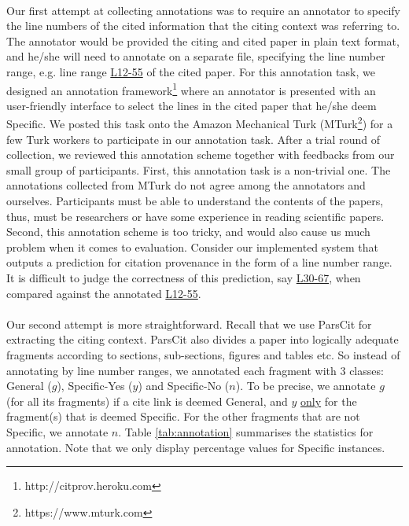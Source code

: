 \paragraph{}
Our first attempt at collecting annotations was to require an annotator to specify the line numbers of the cited information that the citing context was referring to. The annotator would be provided the citing and cited paper in plain text format, and he/she will need to annotate on a separate file, specifying the line number range, e.g. line range \url{L12-55} of the cited paper. For this annotation task, we designed an annotation framework\footnote{http://citprov.heroku.com} where an annotator is presented with an user-friendly interface to select the lines in the cited paper that he/she deem Specific. We posted this task onto the Amazon Mechanical Turk (MTurk\footnote{https://www.mturk.com}) for a few Turk workers to participate in our annotation task. After a trial round of collection, we reviewed this annotation scheme together with feedbacks from our small group of participants. First, this annotation task is a non-trivial one. The annotations collected from MTurk do not agree among the annotators and ourselves. Participants must be able to understand the contents of the papers, thus, must be researchers or have some experience in reading scientific papers. Second, this annotation scheme is too tricky, and would also cause us much problem when it comes to evaluation. Consider our implemented system that outputs a prediction for citation provenance in the form of a line number range. It is difficult to judge the correctness of this prediction, say \url{L30-67}, when compared against the annotated \url{L12-55}.


\paragraph{}
Our second attempt is more straightforward. Recall that we use ParsCit for extracting the citing context. ParsCit also divides a paper into logically adequate fragments according to sections, sub-sections, figures and tables etc. So instead of annotating by line number ranges, we annotated each fragment with 3 classes: General ($g$), Specific-Yes ($y$) and Specific-No ($n$). To be precise, we annotate $g$ (for all its fragments) if a cite link is deemed General, and $y$ \underline{only} for the fragment(s) that is deemed Specific. For the other fragments that are not Specific, we annotate $n$. Table \ref{tab:annotation} summarises the statistics for annotation. Note that we only display percentage values for Specific instances.

